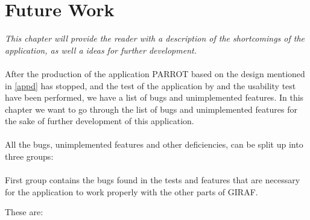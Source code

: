 \chapter{Future Work}

\textit{This chapter will provide the reader with a description of the shortcomings of the application, as well a ideas for further development. }\\
\\
After the production of the application PARROT based on the design mentioned in \autoref{appd} has stopped, and the test of the application by and the usability test have been performed, we have a list of bugs and unimplemented features.\newline
In this chapter we want to go through the list of bugs and unimplemented features for the sake of further development of this application.\\
\\
All the bugs, unimplemented features and other deficiencies, can be split up into three groups:\\
\\
First group contains the bugs found in the tests and features that are necessary for the application to work properly with the other parts of GIRAF.\newline 

These are:

